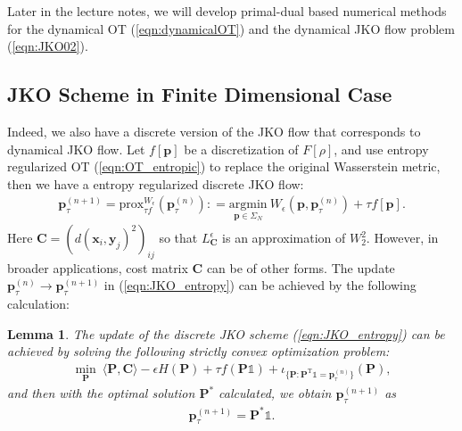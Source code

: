 \documentclass[11pt]{book}
\newtheorem{lemma}[theorem]{Lemma}
\begin{document}
Later in the lecture notes, we will develop primal-dual based numerical methods for the dynamical OT (\ref{eqn:dynamicalOT}) and the dynamical JKO flow problem (\ref{eqn:JKO02}).





\subsection{JKO Scheme in Finite Dimensional Case}

Indeed, we also have a discrete version of the JKO flow that corresponds to dynamical JKO flow. Let $f[\mathbf{p}]$ be a discretization of $F[\rho]$, and use entropy regularized OT (\ref{eqn:OT_entropic}) to replace the original Wasserstein metric, then we have a entropy regularized discrete JKO flow:
\begin{align}\label{eqn:JKO_entropy}
    \mathbf{p}_{\tau}^{(n+1)} = \text{prox}_{\tau f}^{W_{\epsilon}}\left(\mathbf{p}_{\tau}^{(n)}\right): =  \underset{\mathbf{p}\in\Sigma_N}{\mathrm{argmin}} \ W_{\epsilon}(\mathbf{p},\mathbf{p}_{\tau}^{(n)}) + \tau f[\mathbf{p}].
\end{align}
Here $\mathbf{C} = (d(\mathbf{x}_i,\mathbf{y}_j)^2)_{ij}$ so that $L_{\mathbf{C}}^{\epsilon}$ is an approximation of $W_2^2$. However, in broader applications, cost matrix $\mathbf{C}$ can be of other forms. The update $\mathbf{p}_{\tau}^{(n)} \to \mathbf{p}_{\tau}^{(n+1)}$ in (\ref{eqn:JKO_entropy}) can be achieved by the following calculation: 
\begin{lemma}
The update of the discrete JKO scheme (\ref{eqn:JKO_entropy}) can be achieved by solving the following strictly convex optimization problem:
\begin{align}\label{eqn:discreteJKO_step1}
    \min_{\mathbf{P}} \ \langle \mathbf{P}, \mathbf{C} \rangle - \epsilon H(\mathbf{P}) + \tau f(\mathbf{P}\mathbb{1}) + \iota_{\{\mathbf{P}:\mathbf{P}^{\mathrm{T}}\mathbb{1}=\mathbf{p}_{\tau}^{(n)}\}}(\mathbf{P}),
\end{align}
and then with the optimal solution $\mathbf{P}^*$ calculated, we obtain $\mathbf{p}_{\tau}^{(n+1)}$ as
\begin{align}
   \mathbf{p}_{\tau}^{(n+1)} = \mathbf{P}^*\mathbb{1}.
\end{align}
\end{lemma}
\end{document}

